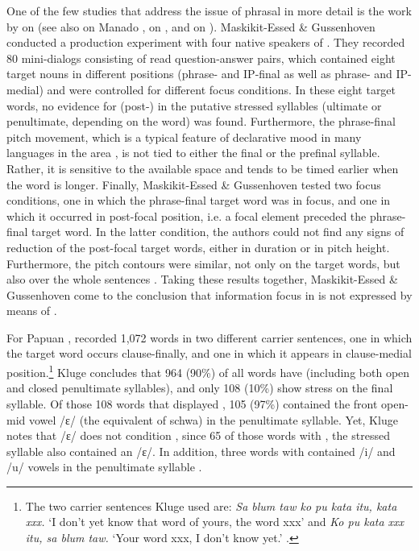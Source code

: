 \documentclass[output=paper
,modfonts
,nonflat]{langsci/langscibook}
\begin{document}
One of the few studies that address the issue of phrasal  in more detail is the work by \citet{Maskikit-Essed2016} on   (see also \citealt{Stoel2007} on Manado , \citealt{Himmelmann2010} on , and \citealt{Clynes2011} on ). Maskikit-Essed \& Gussenhoven conducted a production experiment with four native speakers of  . They recorded 80 mini-dialogs consisting of read question-answer pairs, which contained eight target nouns in different positions (phrase- and IP-final as well as phrase- and IP-medial) and were controlled for different focus conditions. In these eight target words, no evidence for (post-) in the putative stressed syllables (ultimate or penultimate, depending on the word) was found. Furthermore, the phrase-final pitch movement, which is a typical feature of declarative mood in many languages in the area \citep[67]{Himmelmann2010}, is not tied to either the final or the prefinal syllable. Rather, it is sensitive to the available space and tends to be timed earlier when the word is longer. Finally, Maskikit-Essed \& Gussenhoven tested two focus conditions, one in which the phrase-final target word was in focus, and one in which it occurred in post-focal position, i.e. a focal element preceded the phrase-final target word. In the latter condition, the authors could not find any signs of reduction of the post-focal target words, either in duration or in pitch height. Furthermore, the pitch contours were similar, not only on the target words, but also over the whole sentences \citep[372]{Maskikit-Essed2016}. Taking these results together, Maskikit-Essed \& Gussenhoven come to the conclusion that information focus in   is not expressed by means of .

For Papuan , \citet{Kluge2014} recorded 1,072 words in two different carrier sentences, one in which the target word occurs clause-finally, and one in which it appears in clause-medial position.\footnote{The two carrier sentences Kluge used are: \textit{Sa blum taw ko pu kata itu, kata xxx.} ‘I don’t yet know that word of yours, the word xxx’ and \textit{Ko pu kata xxx itu, sa blum taw.} ‘Your word xxx, I don’t know yet.’ \citep[57]{Kluge2014}. } Kluge concludes that 964 (90\%) of all words have  (including both open and closed penultimate syllables), and only 108 (10\%) show stress on the final syllable. Of those 108 words that displayed , 105 (97\%) contained the front open-mid vowel /ɛ/ (the equivalent of  schwa) in the penultimate syllable. Yet, Kluge notes that /ɛ/ does not condition , since 65 of those words with , the stressed syllable also contained an /ɛ/. In addition, three words with  contained /i/ and /u/ vowels in the penultimate syllable \citep[89]{Kluge2014}.
\end{document}

